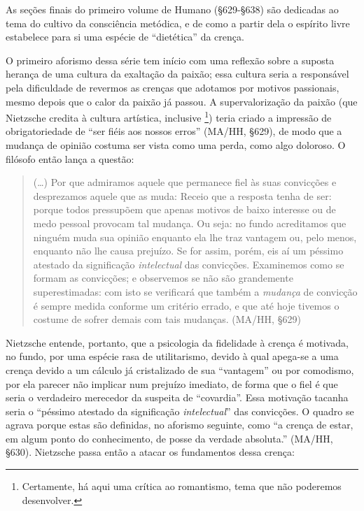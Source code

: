 \documentclass[
	12pt,				%
	openright,			%
	oneside,			%
	a4paper,			%
	english,			%
	french,				%
	spanish,			%
	brazil				%
	]{abntex2}
\begin{document}
	As seções finais do primeiro volume de Humano (§629-§638) são dedicadas ao tema do cultivo da consciência metódica, e de como a partir dela o espírito livre estabelece para si uma espécie de “dietética” da crença.
	
	O primeiro aforismo dessa série tem início com uma reflexão sobre a suposta herança de uma cultura da exaltação da paixão; essa cultura seria a responsável pela dificuldade de revermos as crenças que adotamos por motivos passionais, mesmo depois que o calor da paixão já passou. A supervalorização da paixão (que Nietzsche credita à cultura artística, inclusive
\footnote{Certamente, há aqui uma crítica ao romantismo, tema que não poderemos desenvolver.}) 
teria criado a impressão de obrigatoriedade de “ser fiéis aos nossos erros” (MA/HH, §629), de modo que a mudança de opinião costuma ser vista como uma perda, como algo doloroso. O filósofo então lança a questão:

\begin{quotation}
(…) Por que admiramos aquele que permanece fiel às suas convicções e desprezamos aquele que as muda: Receio que a resposta tenha de ser: porque todos pressupõem que apenas motivos de baixo interesse ou de medo pessoal provocam tal mudança. Ou seja: no fundo acreditamos que ninguém muda sua opinião enquanto ela lhe traz vantagem ou, pelo menos, enquanto não lhe causa prejuízo. Se for assim, porém, eis aí um péssimo atestado da significação \textit{intelectual} das convicções. Examinemos como se formam as convicções; e observemos se não são grandemente superestimadas: com isto se verificará que também a \textit{mudança} de convicção é sempre medida conforme um critério errado, e que até hoje tivemos o costume de sofrer demais com tais mudanças. (MA/HH, §629)
\end{quotation}

Nietzsche entende, portanto, que a psicologia da fidelidade à crença é motivada, no fundo, por uma espécie rasa de utilitarismo, devido à qual apega-se a uma crença devido a um cálculo já cristalizado de sua “vantagem” ou por comodismo, por ela parecer não implicar num prejuízo imediato, de forma que o fiel é que seria o verdadeiro merecedor da suspeita de “covardia”. Essa motivação tacanha seria o “péssimo atestado da significação \textit{intelectual}” das convicções. O quadro se agrava porque estas são definidas, no aforismo seguinte, como “a crença de estar, em algum ponto do conhecimento, de posse da verdade absoluta.” (MA/HH, §630). Nietzsche passa então a atacar os fundamentos dessa crença:
\end{document}
